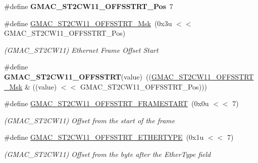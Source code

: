 \begin{DoxyCompactItemize}
\item 
\mbox{\label{group__SAMV71__GMAC_ga4c425aa9dd4520c26fc43de99863c5ec}} 
\#define {\bfseries G\+M\+A\+C\+\_\+\+S\+T2\+C\+W11\+\_\+\+O\+F\+F\+S\+S\+T\+R\+T\+\_\+\+Pos}~7
\item 
\mbox{\label{group__SAMV71__GMAC_gac424382123f6ce476dea308b4a6ffdd9}} 
\#define \mbox{\hyperlink{group__SAMV71__GMAC_gac424382123f6ce476dea308b4a6ffdd9}{G\+M\+A\+C\+\_\+\+S\+T2\+C\+W11\+\_\+\+O\+F\+F\+S\+S\+T\+R\+T\+\_\+\+Msk}}~(0x3u $<$$<$ G\+M\+A\+C\+\_\+\+S\+T2\+C\+W11\+\_\+\+O\+F\+F\+S\+S\+T\+R\+T\+\_\+\+Pos)
\begin{DoxyCompactList}\small\item\em (G\+M\+A\+C\+\_\+\+S\+T2\+C\+W11) Ethernet Frame Offset Start \end{DoxyCompactList}\item 
\mbox{\label{group__SAMV71__GMAC_gabb652fe56b38ef037700a3026e68d37d}} 
\#define {\bfseries G\+M\+A\+C\+\_\+\+S\+T2\+C\+W11\+\_\+\+O\+F\+F\+S\+S\+T\+RT}(value)~((\mbox{\hyperlink{group__SAMV71__GMAC_gac424382123f6ce476dea308b4a6ffdd9}{G\+M\+A\+C\+\_\+\+S\+T2\+C\+W11\+\_\+\+O\+F\+F\+S\+S\+T\+R\+T\+\_\+\+Msk}} \& ((value) $<$$<$ G\+M\+A\+C\+\_\+\+S\+T2\+C\+W11\+\_\+\+O\+F\+F\+S\+S\+T\+R\+T\+\_\+\+Pos)))
\item 
\mbox{\label{group__SAMV71__GMAC_gab232b096f7789e863a94d0d3ba0dfc0c}} 
\#define \mbox{\hyperlink{group__SAMV71__GMAC_gab232b096f7789e863a94d0d3ba0dfc0c}{G\+M\+A\+C\+\_\+\+S\+T2\+C\+W11\+\_\+\+O\+F\+F\+S\+S\+T\+R\+T\+\_\+\+F\+R\+A\+M\+E\+S\+T\+A\+RT}}~(0x0u $<$$<$ 7)
\begin{DoxyCompactList}\small\item\em (G\+M\+A\+C\+\_\+\+S\+T2\+C\+W11) Offset from the start of the frame \end{DoxyCompactList}\item 
\mbox{\label{group__SAMV71__GMAC_ga016caa5db9bdaf635e8edb926cee9f40}} 
\#define \mbox{\hyperlink{group__SAMV71__GMAC_ga016caa5db9bdaf635e8edb926cee9f40}{G\+M\+A\+C\+\_\+\+S\+T2\+C\+W11\+\_\+\+O\+F\+F\+S\+S\+T\+R\+T\+\_\+\+E\+T\+H\+E\+R\+T\+Y\+PE}}~(0x1u $<$$<$ 7)
\begin{DoxyCompactList}\small\item\em (G\+M\+A\+C\+\_\+\+S\+T2\+C\+W11) Offset from the byte after the Ether\+Type field \end{DoxyCompactList}\item 

\end{DoxyCompactItemize}
